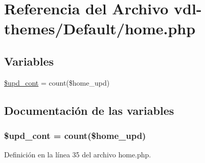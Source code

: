 \hypertarget{home_8php}{\section{Referencia del Archivo vdl-\/themes/\-Default/home.php}
\label{home_8php}
}
\subsection*{Variables}
\begin{DoxyCompactItemize}
\item 
\hyperlink{home_8php_a3a439a15605194913fa6956129cc3e2d}{\$upd\-\_\-cont} = count(\$home\-\_\-upd)
\end{DoxyCompactItemize}


\subsection{Documentación de las variables}
\hypertarget{home_8php_a3a439a15605194913fa6956129cc3e2d}{
\subsubsection[{\$upd\-\_\-cont}]{\setlength{\rightskip}{0pt plus 5cm}\$upd\-\_\-cont = count(\$home\-\_\-upd)}}\label{home_8php_a3a439a15605194913fa6956129cc3e2d}


Definición en la línea 35 del archivo home.\-php.

